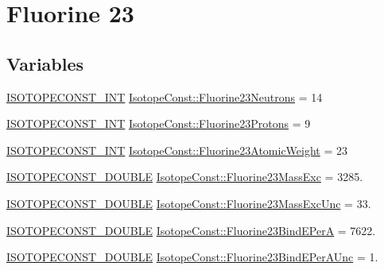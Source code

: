 \hypertarget{group___isotope_const-_fluorine-_f23}{}\section{Fluorine 23}
\label{group___isotope_const-_fluorine-_f23}
\subsection*{Variables}
\begin{DoxyCompactItemize}
\item 
\mbox{\hyperlink{group___isotope_const-_macros_ga5f18360b3e99483a35c32d789e62621c}{I\+S\+O\+T\+O\+P\+E\+C\+O\+N\+S\+T\+\_\+\+I\+NT}} \mbox{\hyperlink{group___isotope_const-_fluorine-_f23_ga115434e833ccc846cf6a9c4ef3207e4a}{Isotope\+Const\+::\+Fluorine23\+Neutrons}} = 14
\item 
\mbox{\hyperlink{group___isotope_const-_macros_ga5f18360b3e99483a35c32d789e62621c}{I\+S\+O\+T\+O\+P\+E\+C\+O\+N\+S\+T\+\_\+\+I\+NT}} \mbox{\hyperlink{group___isotope_const-_fluorine-_f23_gab5490ba703279839812127c08992ff94}{Isotope\+Const\+::\+Fluorine23\+Protons}} = 9
\item 
\mbox{\hyperlink{group___isotope_const-_macros_ga5f18360b3e99483a35c32d789e62621c}{I\+S\+O\+T\+O\+P\+E\+C\+O\+N\+S\+T\+\_\+\+I\+NT}} \mbox{\hyperlink{group___isotope_const-_fluorine-_f23_gaa483c90281a962f1179e910a5c34441a}{Isotope\+Const\+::\+Fluorine23\+Atomic\+Weight}} = 23
\item 
\mbox{\hyperlink{group___isotope_const-_macros_ga8f45a7272ce02c0b4c65c44636ed719a}{I\+S\+O\+T\+O\+P\+E\+C\+O\+N\+S\+T\+\_\+\+D\+O\+U\+B\+LE}} \mbox{\hyperlink{group___isotope_const-_fluorine-_f23_gab575b349e0826fce7ef805466e4bd79b}{Isotope\+Const\+::\+Fluorine23\+Mass\+Exc}} = 3285.
\item 
\mbox{\hyperlink{group___isotope_const-_macros_ga8f45a7272ce02c0b4c65c44636ed719a}{I\+S\+O\+T\+O\+P\+E\+C\+O\+N\+S\+T\+\_\+\+D\+O\+U\+B\+LE}} \mbox{\hyperlink{group___isotope_const-_fluorine-_f23_ga279c95b608638d8369448766c42dd865}{Isotope\+Const\+::\+Fluorine23\+Mass\+Exc\+Unc}} = 33.
\item 
\mbox{\hyperlink{group___isotope_const-_macros_ga8f45a7272ce02c0b4c65c44636ed719a}{I\+S\+O\+T\+O\+P\+E\+C\+O\+N\+S\+T\+\_\+\+D\+O\+U\+B\+LE}} \mbox{\hyperlink{group___isotope_const-_fluorine-_f23_ga7d4b917e5184787e8eec8aac09723bce}{Isotope\+Const\+::\+Fluorine23\+Bind\+E\+PerA}} = 7622.
\item 
\mbox{\hyperlink{group___isotope_const-_macros_ga8f45a7272ce02c0b4c65c44636ed719a}{I\+S\+O\+T\+O\+P\+E\+C\+O\+N\+S\+T\+\_\+\+D\+O\+U\+B\+LE}} \mbox{\hyperlink{group___isotope_const-_fluorine-_f23_ga842193152121c8affdd13578f12154d2}{Isotope\+Const\+::\+Fluorine23\+Bind\+E\+Per\+A\+Unc}} = 1.

\end{DoxyCompactItemize}
